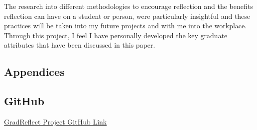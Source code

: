 \documentclass{l4proj}
\begin{document}
The research into different methodologies to encourage reflection and the benefits reflection can have on a student or person, were particularly insightful and these practices will be taken into my future projects and with me into the workplace. Through this project, I feel I have personally developed the key graduate attributes that have been discussed in this paper.


%
% 

\begin{appendices}

\chapter{Appendices}







\section{GitHub}\label{AppendixGitHub}

\href{https://github.com/gmtmcd/Level-4-Individual-Project}{GradReflect Project GitHub Link}


\end{appendices}
\end{document}

